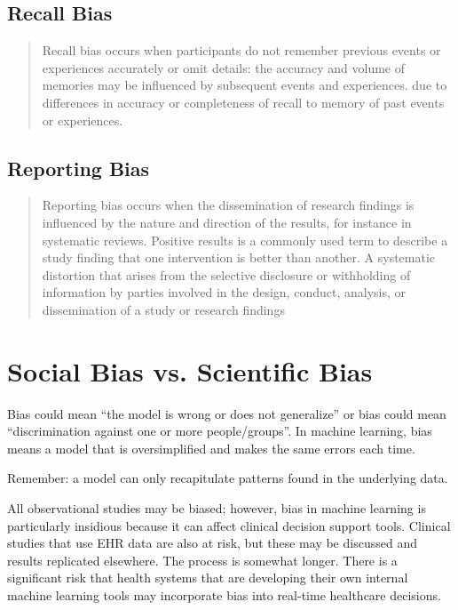 \subsection{Recall Bias}

\begin{quote}
Recall bias occurs when participants do not remember previous events or experiences accurately or omit details: the accuracy and volume of memories may be influenced by subsequent events and experiences. due to differences in accuracy or completeness of recall to memory of past events or experiences.
\end{quote}

\subsection{Reporting Bias}

\begin{quote}
Reporting bias occurs when the dissemination of research findings is influenced by the nature and direction of the results, for instance in systematic reviews. Positive results is a commonly used term to describe a study finding that one intervention is better than another. A systematic distortion that arises from the selective disclosure or withholding of information by parties involved in the design, conduct, analysis, or dissemination of a study or research findings
\end{quote}



\section{Social Bias vs. Scientific Bias}

Bias could mean ``the model is wrong or does not generalize'' or bias could mean ``discrimination against one or more people/groups''. In machine learning, bias means a model that is oversimplified and makes the same errors each time. 

Remember: a model can only recapitulate patterns found in the underlying data. 

All observational studies may be biased; however, bias in machine learning is particularly insidious because it can affect clinical decision support tools. Clinical studies that use EHR data are also at risk, but these may be discussed and results replicated elsewhere. The process is somewhat longer. There is a significant risk that health systems that are developing their own internal machine learning tools may incorporate bias into real-time healthcare decisions. 

